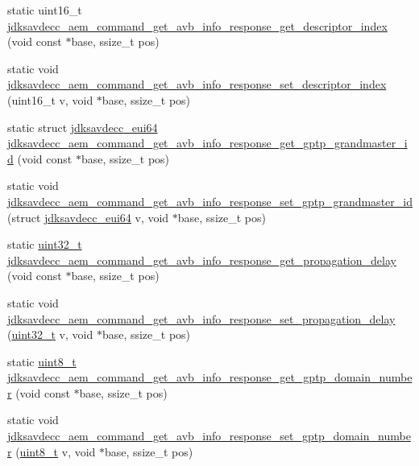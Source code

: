\begin{DoxyCompactItemize}
\item 
static uint16\+\_\+t \hyperlink{group__command__get__avb__info__response_gad4356122ebdad47f8c63588a4c48d2e7}{jdksavdecc\+\_\+aem\+\_\+command\+\_\+get\+\_\+avb\+\_\+info\+\_\+response\+\_\+get\+\_\+descriptor\+\_\+index} (void const $\ast$base, ssize\+\_\+t pos)
\item 
static void \hyperlink{group__command__get__avb__info__response_ga022450bace1fe824d32b55fc4eea8a5a}{jdksavdecc\+\_\+aem\+\_\+command\+\_\+get\+\_\+avb\+\_\+info\+\_\+response\+\_\+set\+\_\+descriptor\+\_\+index} (uint16\+\_\+t v, void $\ast$base, ssize\+\_\+t pos)
\item 
static struct \hyperlink{structjdksavdecc__eui64}{jdksavdecc\+\_\+eui64} \hyperlink{group__command__get__avb__info__response_ga8d77049563ce3ab9701d65b1b609e386}{jdksavdecc\+\_\+aem\+\_\+command\+\_\+get\+\_\+avb\+\_\+info\+\_\+response\+\_\+get\+\_\+gptp\+\_\+grandmaster\+\_\+id} (void const $\ast$base, ssize\+\_\+t pos)
\item 
static void \hyperlink{group__command__get__avb__info__response_gaa3ecdb76b6150341b0c999d0cb90b5c7}{jdksavdecc\+\_\+aem\+\_\+command\+\_\+get\+\_\+avb\+\_\+info\+\_\+response\+\_\+set\+\_\+gptp\+\_\+grandmaster\+\_\+id} (struct \hyperlink{structjdksavdecc__eui64}{jdksavdecc\+\_\+eui64} v, void $\ast$base, ssize\+\_\+t pos)
\item 
static \hyperlink{parse_8c_a6eb1e68cc391dd753bc8ce896dbb8315}{uint32\+\_\+t} \hyperlink{group__command__get__avb__info__response_ga76172082dcd1e5c5a962eb4f017d3af3}{jdksavdecc\+\_\+aem\+\_\+command\+\_\+get\+\_\+avb\+\_\+info\+\_\+response\+\_\+get\+\_\+propagation\+\_\+delay} (void const $\ast$base, ssize\+\_\+t pos)
\item 
static void \hyperlink{group__command__get__avb__info__response_ga60d33fa91dca37320b28ad96c6d2cc35}{jdksavdecc\+\_\+aem\+\_\+command\+\_\+get\+\_\+avb\+\_\+info\+\_\+response\+\_\+set\+\_\+propagation\+\_\+delay} (\hyperlink{parse_8c_a6eb1e68cc391dd753bc8ce896dbb8315}{uint32\+\_\+t} v, void $\ast$base, ssize\+\_\+t pos)
\item 
static \hyperlink{stdint_8h_aba7bc1797add20fe3efdf37ced1182c5}{uint8\+\_\+t} \hyperlink{group__command__get__avb__info__response_ga538dcc0ede8c2bb4b3a178ff9db2ce69}{jdksavdecc\+\_\+aem\+\_\+command\+\_\+get\+\_\+avb\+\_\+info\+\_\+response\+\_\+get\+\_\+gptp\+\_\+domain\+\_\+number} (void const $\ast$base, ssize\+\_\+t pos)
\item 
static void \hyperlink{group__command__get__avb__info__response_ga6ecca7f33089d968a61a837f12c90ec1}{jdksavdecc\+\_\+aem\+\_\+command\+\_\+get\+\_\+avb\+\_\+info\+\_\+response\+\_\+set\+\_\+gptp\+\_\+domain\+\_\+number} (\hyperlink{stdint_8h_aba7bc1797add20fe3efdf37ced1182c5}{uint8\+\_\+t} v, void $\ast$base, ssize\+\_\+t pos)

\end{DoxyCompactItemize}
